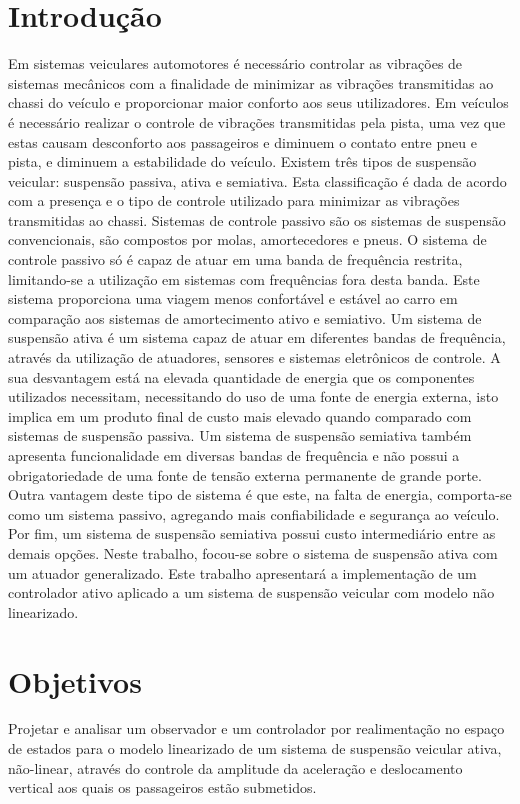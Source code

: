 \documentclass[a4paper]{ifacconf}
\begin{document}
    \section{Introdução}
    Em sistemas veiculares automotores é necessário controlar as vibrações de sistemas mecânicos com a finalidade de minimizar as vibrações transmitidas ao chassi do veículo e proporcionar maior conforto aos seus utilizadores.
    Em veículos é necessário realizar o controle de vibrações transmitidas pela pista, uma vez que estas causam desconforto aos passageiros e diminuem o contato entre pneu e pista, e diminuem a estabilidade do veículo.
    Existem três tipos de suspensão veicular: suspensão passiva, ativa e semiativa. Esta classificação é dada de acordo com a presença e o tipo de controle utilizado para minimizar as vibrações transmitidas ao chassi.
    Sistemas de controle passivo são os sistemas de suspensão convencionais, são compostos por molas, amortecedores e pneus. O sistema de controle passivo só é capaz de atuar em uma banda de frequência restrita, limitando-se a utilização em sistemas com frequências fora desta banda. Este sistema proporciona uma viagem menos confortável e estável ao carro em comparação aos sistemas de amortecimento ativo e semiativo.
    Um sistema de suspensão ativa é um sistema capaz de atuar em diferentes bandas de frequência, através da utilização de atuadores, sensores e sistemas eletrônicos de controle. A sua desvantagem está na elevada quantidade de energia que os componentes utilizados necessitam, necessitando do uso de uma fonte de energia externa, isto implica em um produto final de custo mais elevado quando comparado com sistemas de suspensão passiva.
    Um sistema de suspensão semiativa também apresenta funcionalidade em diversas bandas de frequência e não possui a obrigatoriedade de uma fonte de tensão externa permanente de grande porte. Outra vantagem deste tipo de sistema é que este, na falta de energia, comporta-se como um sistema passivo, agregando mais confiabilidade e segurança ao veículo. Por fim, um sistema de suspensão semiativa possui custo intermediário entre as demais opções.
    Neste trabalho, focou-se sobre o sistema de suspensão ativa com um atuador generalizado. Este trabalho apresentará a implementação de um controlador ativo aplicado a um sistema de suspensão veicular com modelo não linearizado.
    \section{Objetivos}
    Projetar e analisar um observador e um controlador por realimentação no espaço de estados para o modelo linearizado de um sistema de suspensão veicular ativa, não-linear, através do controle da amplitude da aceleração e deslocamento vertical aos quais os passageiros estão submetidos. 
    
\end{document}
